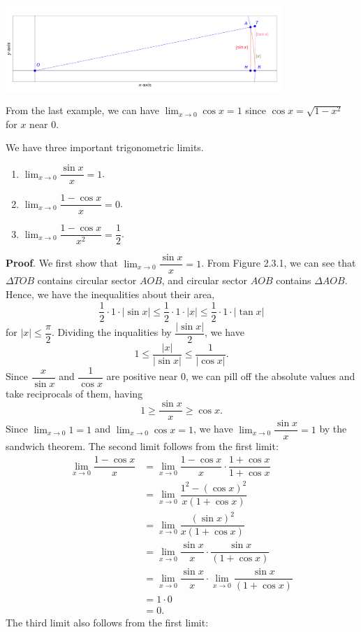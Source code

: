 \documentclass[11pt]{book}
\begin{document}
\begin{center}
    \includegraphics[width=0.79\textwidth]{sandwich_1.png}
\end{center}

\begin{example}
    From the last example, we can have $\displaystyle\lim_{x\to 0}\cos x=1$ since $\cos x=\sqrt{1-x^2}$ for $x$ near $0$.
\end{example}

\begin{theorem}
    We have three important trigonometric limits.
    \begin{enumerate}
        \item $\displaystyle\lim_{x\to 0}\dfrac{\sin x}{x}=1$.
        \item $\displaystyle\lim_{x\to 0}\dfrac{1-\cos x}{x}=0$.
        \item $\displaystyle\lim_{x\to 0}\dfrac{1-\cos x}{x^2}=\dfrac{1}{2}$.
    \end{enumerate}
\end{theorem}
\textbf{Proof}. We first show that $\displaystyle\lim_{x\to 0}\dfrac{\sin x}{x}=1$. From Figure 2.3.1, we can see that $\Delta TOB$ contains circular sector $AOB$, and circular sector $AOB$ contains $\Delta AOB$. Hence, we have the inequalities about their area, $$\dfrac{1}{2}\cdot1\cdot |\sin x|\leq\dfrac{1}{2}\cdot1\cdot|x|\leq\dfrac{1}{2}\cdot 1\cdot |\tan x|$$ for $|x|\leq\dfrac{\pi}{2}$. Dividing the inqualities by $\dfrac{|\sin x|}{2}$, we have $$1\leq\dfrac{|x|}{|\sin x|}\leq\dfrac{1}{|\cos x|}.$$ Since $\dfrac{x}{\sin x}$ and $\dfrac{1}{\cos x}$ are positive near $0$, we can pill off the absolute values and take reciprocals of them, having $$1\geq\dfrac{\sin x}{x}\geq\cos x.$$ Since $\displaystyle\lim_{x\to 0}1=1$ and $\displaystyle\lim_{x\to 0}\cos x=1$, we have $\displaystyle\lim_{x\to 0}\dfrac{\sin x}{x}=1$ by the sandwich theorem. The second limit follows from the first limit:
\begin{align*}
    \lim_{x\to 0}\dfrac{1-\cos x}{x}&=\lim_{x\to 0}\dfrac{1-\cos x}{x}\cdot\dfrac{1+\cos x}{1+\cos x}\\
    &=\lim_{x\to 0}\dfrac{1^2-(\cos x)^2}{x(1+\cos x)}\\
    &=\lim_{x\to 0}\dfrac{(\sin x)^2}{x(1+\cos x)}\\
    &=\lim_{x\to 0}\dfrac{\sin x}{x}\cdot\dfrac{\sin x}{(1+\cos x)}\\
    &=\lim_{x\to 0}\dfrac{\sin x}{x}\cdot\lim_{x\to 0}\dfrac{\sin x}{(1+\cos x)}\\
    &=1\cdot0\\
    &=0.
\end{align*} The third limit also follows from the first limit: 
\end{document}
